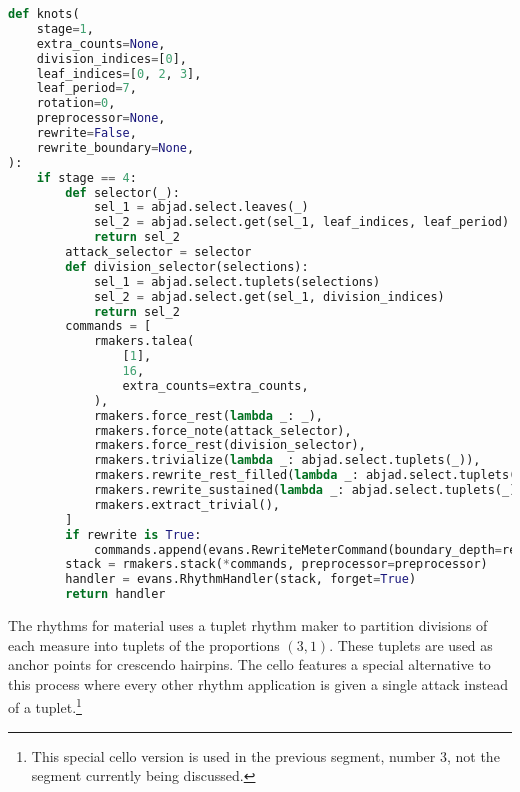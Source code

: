 \begin{lstlisting}[language=Python,frame=tb,caption={Stage 4 of material F rhythms in Polillas},label=lst:p-f-rhythm]
def knots(
    stage=1,
    extra_counts=None,
    division_indices=[0],
    leaf_indices=[0, 2, 3],
    leaf_period=7,
    rotation=0,
    preprocessor=None,
    rewrite=False,
    rewrite_boundary=None,
):
    if stage == 4:
        def selector(_):
            sel_1 = abjad.select.leaves(_)
            sel_2 = abjad.select.get(sel_1, leaf_indices, leaf_period)
            return sel_2
        attack_selector = selector
        def division_selector(selections):
            sel_1 = abjad.select.tuplets(selections)
            sel_2 = abjad.select.get(sel_1, division_indices)
            return sel_2
        commands = [
            rmakers.talea(
                [1],
                16,
                extra_counts=extra_counts,
            ),
            rmakers.force_rest(lambda _: _),
            rmakers.force_note(attack_selector),
            rmakers.force_rest(division_selector),
            rmakers.trivialize(lambda _: abjad.select.tuplets(_)),
            rmakers.rewrite_rest_filled(lambda _: abjad.select.tuplets(_)),
            rmakers.rewrite_sustained(lambda _: abjad.select.tuplets(_)),
            rmakers.extract_trivial(),
        ]
        if rewrite is True:
            commands.append(evans.RewriteMeterCommand(boundary_depth=rewrite_boundary))
        stack = rmakers.stack(*commands, preprocessor=preprocessor)
        handler = evans.RhythmHandler(stack, forget=True)
        return handler
\end{lstlisting}

The rhythms for material  uses a tuplet rhythm maker to partition divisions of each measure into tuplets of the proportions $(3, 1)$. These tuplets are used as anchor points for crescendo hairpins. The cello features a special alternative to this process where every other rhythm application is given a single attack instead of a tuplet.\footnote{This special cello version is used in the previous segment, number 3, not the segment currently being discussed.}

